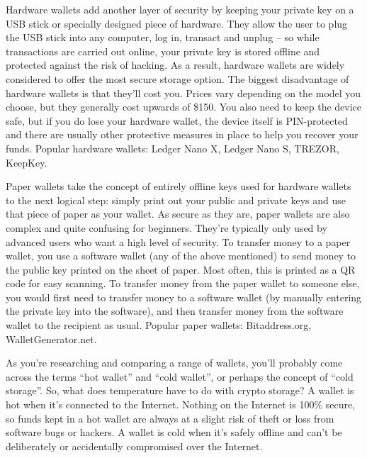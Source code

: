 Hardware wallets add another layer of security by keeping your private key on a USB stick or specially designed piece of hardware. They allow the user to plug the USB stick into any computer, log in, transact and unplug – so while transactions are carried out online, your private key is stored offline and protected against the risk of hacking. As a result, hardware wallets are widely considered to offer the most secure storage option. The biggest disadvantage of hardware wallets is that they’ll cost you. Prices vary depending on the model you choose, but they generally cost upwards of \$150. You also need to keep the device safe, but if you do lose your hardware wallet, the device itself is PIN-protected and there are usually other protective measures in place to help you recover your funds. Popular hardware wallets: Ledger Nano X, Ledger Nano S, TREZOR, KeepKey.

Paper wallets take the concept of entirely offline keys used for hardware wallets to the next logical step: simply print out your public and private keys and use that piece of paper as your wallet. As secure as they are, paper wallets are also complex and quite confusing for beginners. They’re typically only used by advanced users who want a high level of security. To transfer money to a paper wallet, you use a software wallet (any of the above mentioned) to send money to the public key printed on the sheet of paper. Most often, this is printed as a QR code for easy scanning. To transfer money from the paper wallet to someone else, you would first need to transfer money to a software wallet (by manually entering the private key into the software), and then transfer money from the software wallet to the recipient as usual. Popular paper wallets: Bitaddress.org, WalletGenerator.net.

As you’re researching and comparing a range of wallets, you’ll probably come across the terms “hot wallet” and “cold wallet”, or perhaps the concept of “cold storage”. So, what does temperature have to do with crypto storage? A wallet is hot when it's connected to the Internet. Nothing on the Internet is 100\% secure, so funds kept in a hot wallet are always at a slight risk of theft or loss from software bugs or hackers. A wallet is cold when it's safely offline and can't be deliberately or accidentally compromised over the Internet.

